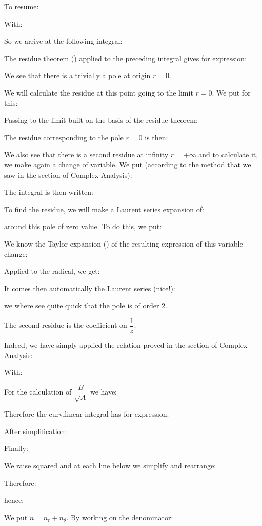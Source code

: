 	To resume:
	
	With:
	
	So we arrive at the following integral:
	
	The residue theorem () applied to the preceding integral gives for expression:
	
	We see that there is a trivially a pole at origin $r=0$.

	We will calculate the residue at this point going to the limit $r=0$. We put for this:
	
	Passing to the limit built on the basis of the residue theorem:
	
	The residue corresponding to the pole $r=0$ is then:
	
	We also see that there is a second residue at infinity $r=+\infty$ and to calculate it, we make again a change of variable. We put (according to the method that we saw in the section of Complex  Analysis):
	
	The integral is then written:
	
	To find the residue, we will make a Laurent series expansion of:
	
	around this pole of zero value. To do this, we put:
	
	We know the Taylor expansion () of the resulting expression of this variable change:
	
	Applied to the radical, we get:
	
	It comes then automatically the Laurent series (nice!):
	
	we where see quite quick that the pole is of order $2$.
	
	The second residue is the coefficient on $\dfrac{1}{z}$:
	
	Indeed, we have simply applied the relation proved in the section of Complex Analysis:
	
	
	With:
	
	For the calculation of $\dfrac{B}{\sqrt{A}}$ we have:
	
		Therefore the curvilinear integral has for expression:
	
	After simplification:
	
	Finally:
	
	We raise squared and at each line below we simplify and rearrange:
	
	Therefore:
	
	hence:
	
	We put $n=n_r+n_\theta$. By working on the denominator:
	
